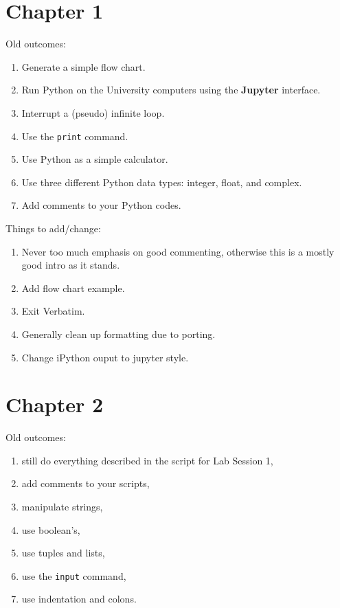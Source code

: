 \section*{Chapter 1}

\noindent Old outcomes:
\begin{enumerate} 
\item Generate a simple flow chart.
\item Run Python on the University computers using the {\bf Jupyter} interface.
\item Interrupt a (pseudo) infinite loop.
\item Use the {\tt print} command.
\item Use Python as a simple calculator.
\item Use three different Python data types: integer, float, and complex.
\item Add comments to your Python codes.
\end{enumerate}

\noindent Things to add/change:
\begin{enumerate}
    \item Never too much emphasis on good commenting, otherwise this is a mostly good intro as it stands.
    \item Add flow chart example.
    \item Exit Verbatim.
    \item Generally clean up formatting due to porting.
    \item Change iPython ouput to jupyter style.
\end{enumerate}

\section*{Chapter 2}

\noindent Old outcomes:
\begin{enumerate}
\item still do everything described in the script for Lab Session 1,
\item add comments to your scripts,
\item manipulate strings,
\item use boolean's,
\item use tuples and lists,
\item use the {\tt input} command,
\item use indentation and colons.
\end{enumerate}

